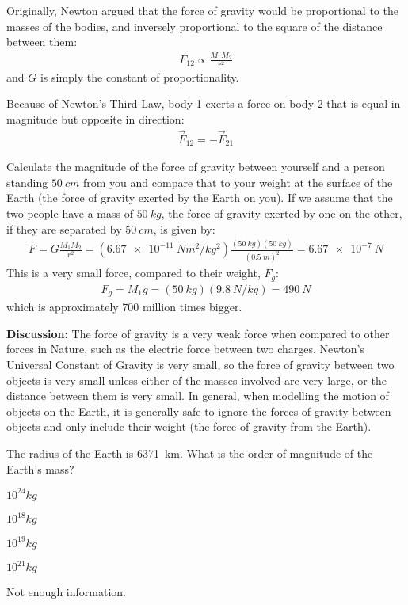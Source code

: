 Originally, Newton argued that the force of gravity would be proportional to the masses of the bodies, and inversely proportional to the square of the distance between them:
\begin{align*}
F_{12}\propto \frac{M_1M_2}{r^2}
\end{align*}
and $G$ is simply the constant of proportionality.

Because of Newton's Third Law, body 1 exerts a force on body 2 that is equal in magnitude but opposite in direction:
\begin{align*}
\vec F_{12} = -\vec F_{21}
\end{align*} 

\begin{example}{Calculate the magnitude of the force of gravity between yourself and a person standing $\SI{50}{cm}$ from you and compare that to your weight at the surface of the Earth (the force of gravity exerted by the Earth on you).}
If we assume that the two people have a mass of $\SI{50}{kg}$, the force of gravity exerted by one on the other, if they are separated by $\SI{50}{cm}$, is given by:
\begin{align*}
F=G\frac{M_1M_2}{r^2}=(\SI{6.67e-11}{Nm^2/kg^2})\frac{(\SI{50}{kg})(\SI{50}{kg})}{(\SI{0.5}{m})^2}=\SI{6.67e-7}{N}
\end{align*}
This is a very small force, compared to their weight, $F_g$:
\begin{align*}
F_g=M_1g=(\SI{50}{kg})(\SI{9.8}{N/kg})=\SI{490}{N}
\end{align*}
which is approximately 700 million times bigger. 

\textbf{Discussion:} The force of gravity is a very weak force when compared to other forces in Nature, such as the electric force between two charges. Newton's Universal Constant of Gravity is very small, so the force of gravity between two objects is very small unless either of the masses involved are very large, or the distance between them is very small. In general, when modelling the motion of objects on the Earth, it is generally safe to ignore the forces of gravity between objects and only include their weight (the force of gravity from the Earth). 
\end{example}

\begin{checkpoint}
\begin{MCquestion}{The radius of the Earth is \SI{6371}{km}. What is the order of magnitude of the Earth's mass?}
\item $10^{24}\si{kg}$\correct
\item $10^{18}\si{kg}$
\item $10^{19}\si{kg}$
\item $10^{21}\si{kg}$
\item Not enough information.
\end{MCquestion}
\end{checkpoint}

